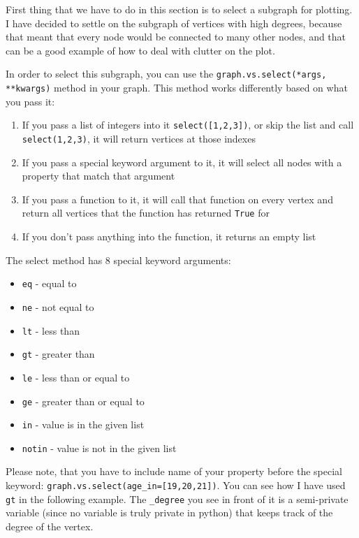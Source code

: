 \documentclass[12pt, a4paper]{article}
\begin{document}
First thing that we have to do in this section is to select a subgraph for plotting. I have decided to settle on the subgraph of vertices with high degrees, because that meant that every node would be connected to many other nodes, and that can be a good example of how to deal with clutter on the plot.

In order to select this subgraph, you can use the \texttt{graph.vs.select(*args, **kwargs)} method in your graph. This method works differently based on what you pass it:\newline

\begin{enumerate}
  \item If you pass a list of integers into it \texttt{select([1,2,3])}, or skip the list and call \texttt{select(1,2,3)}, it will return vertices at those indexes
  \item If you pass a special keyword argument to it, it will select all nodes with a property that match that argument
  \item If you pass a function to it, it will call that function on every vertex and return all vertices that the function has returned \texttt{True} for
  \item If you don't pass anything into the function, it returns an empty list
\end{enumerate}

The select method has 8 special keyword arguments:
\begin{multicols}{2}
  \begin{itemize}
  \item \texttt{eq} - equal to
  \item \texttt{ne} - not equal to
  \item \texttt{lt} - less than
  \item \texttt{gt} - greater than
  \item \texttt{le} - less than or equal to
  \item \texttt{ge} - greater than or equal to
  \item \texttt{in} - value is in the given list
  \item \texttt{notin} - value is not in the given list
  \end{itemize}
\end{multicols}

Please note, that you have to include name of your property before the special keyword: \texttt{graph.vs.select(age_in=[19,20,21])}. You can see how I have used \texttt{gt} in the following example. The \texttt{_degree} you see in front of it is a semi-private variable (since no variable is truly private in python) that keeps track of the degree of the vertex.
\end{document}
